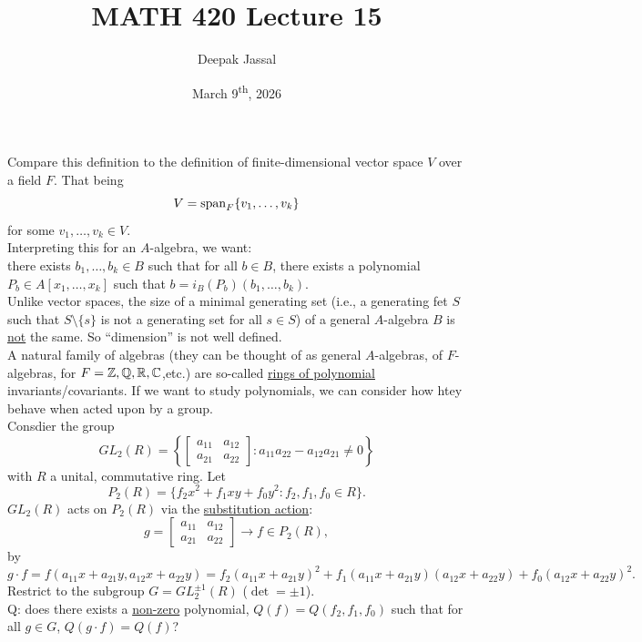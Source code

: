 \documentclass[12pt]{article}
\title{MATH 420 Lecture 15}
\author{Deepak Jassal}
\date{March 9\textsuperscript{th}, 2026}
\begin{document}
\maketitle
{}
Compare this definition to the definition of finite-dimensional vector space $V$ over a field $F$. That being
\[
    V=\operatorname{span}_F\{v_1,\dots,v_k\}
\]
for some $v_1,\dots,v_k\in V$.\\
Interpreting this for an $A$-algebra, we want:\\
there exists $b_1,\dots,b_k\in B$ such that for all $b\in B$, there exists a polynomial $P_b\in A[x_1,\dots,x_k]$ such that $b=i_B(P_b)(b_1,\dots,b_k)$.\\
Unlike vector spaces, the size of a minimal generating set (i.e., a generating fet $S$ such that $S\setminus\{s\}$ is not a generating set for all $s\in S$) of a general $A$-algebra $B$ is \underline{not} the same. So ``dimension'' is not well defined.\\
A natural family of algebras (they can be thought of as general $A$-algebras, of $F$-algebras, for $F=\mathbb{Z},\mathbb{Q},\mathbb{R},\mathbb{C}$,etc.) are so-called \underline{rings of polynomial} invariants/covariants. If we want to study polynomials, we can consider how htey behave when acted upon by a group.\\
Consdier the group
\[
    GL_2(R)=\left\{\begin{bmatrix}
        a_{11}&a_{12}\\a_{21}&a_{22}
    \end{bmatrix}:
    a_{11}a_{22}-a_{12}a_{21}\neq0\right\}
\]
with $R$ a unital, commutative ring. Let 
\[
    P_2(R)=\{f_2x^2+f_1xy+f_0y^2:f_2,f_1,f_0\in R\}.
\]
$GL_2(R)$ acts on $P_2(R)$ via the \underline{substitution action}:
\[
    g=
    \begin{bmatrix}
        a_{11}&a_{12}\\a_{21}&a_{22}
    \end{bmatrix}\to f\in P_2(R),
\]
by 
\[
    g\cdot f=f(a_{11}x+a_{21}y,a_{12}x+a_{22}y)=f_2(a_{11}x+a_{21}y)^2+f_1(a_{11}x+a_{21}y)(a_{12}x+a_{22}y)+f_0(a_{12}x+a_{22}y)^2.
\]
Restrict to the subgroup $G=GL_2^{\pm1}(R)$ ($\det=\pm1$).\\
Q: does there exists a \underline{non-zero} polynomial, $Q(f)=Q(f_2,f_1,f_0)$ such that for all $g\in G$, $Q(g\cdot f)=Q(f)$?\\
\end{document}
